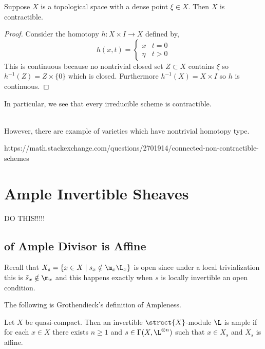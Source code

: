 \documentclass[12pt]{article}
\begin{document}
\begin{lemma}
Suppose $X$ is a topological space with a dense point $\xi \in X$. Then $X$ is contractible.
\end{lemma}

\begin{proof}
Consider the homotopy $h : X \times I \to X$ defined by,
\[ h(x, t) = 
\begin{cases}
x & t = 0
\\
\eta & t > 0
\end{cases} \]
This is continuous because no nontrivial closed set $Z \subset X$ contains $\xi$ so $h^{-1}(Z) = Z \times \{ 0 \}$ which is closed. Furthermore $h^{-1}(X) = X \times I$ so $h$ is continuous. 
\end{proof}

\begin{rmk}
In particular, we see that every irreducible scheme is contractible. 
\end{rmk}
\noindent\\
However, there are example of varieties which have nontrivial homotopy type. 

\begin{example}
https://math.stackexchange.com/questions/2701914/connected-non-contractible-schemes
\end{example}

\section{Ample Invertible Sheaves}

DO THIS!!!!!

\subsection{ of Ample Divisor is Affine}

\begin{rmk}
Recall that $X_s = \{ x \in X \mid s_x \notin \m_x \L_x \}$ is open since under a local trivialization this is $\tilde{s}_x \notin \m_x$ and this happens exactly when $s$ is locally invertible an open condition.
\end{rmk}

\begin{rmk}
The following is Grothendieck's definition of Ampleness.
\end{rmk}

\begin{defn}
Let $X$ be quasi-compact. Then an invertible $\struct{X}$-module $\L$ is ample if for each $x \in X$ there exists $n \ge 1$ and $s \in \Gamma(X, \L^{\otimes n})$ such that $x \in X_s$ and $X_s$ is affine.
\end{defn}
\end{document}
